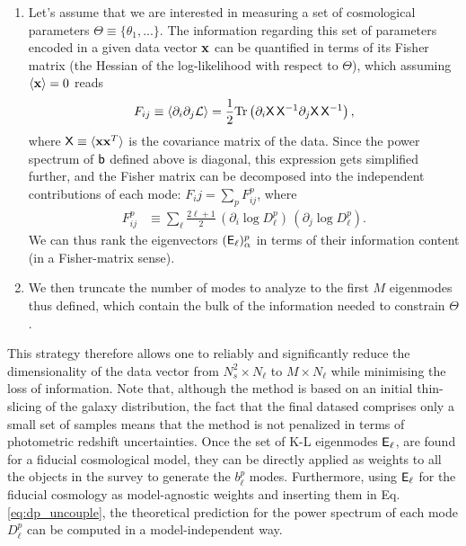\documentclass[twocolumn,amsfont,amssymb,amsmath, showpacs,balancelastpage, nofootinbib]{revtex4-1}
\begin{document}
\begin{enumerate}
      \item Let's assume that we are interested in measuring a set of cosmological parameters $\Theta\equiv\{\theta_1,...\}$. The information regarding this set of parameters encoded in a given data vector ${\bf x}$ can be quantified in terms of its Fisher matrix (the Hessian of the log-likelihood with respect to $\Theta$), which assuming $\langle{\bf x}\rangle=0$ reads
      \begin{equation}
        F_{ij}\equiv\left\langle\partial_i\partial_j{\cal L}\right\rangle=\frac{1}{2}{\rm Tr}\left(\partial_i{\sf X}\,{\sf X}^{-1}\partial_j{\sf X}\,{\sf X}^{-1}\right),
      \end{equation}
      where ${\sf X}\equiv\langle {\bf x}{\bf x}^T\rangle$ is the covariance matrix of the data. Since the power spectrum of ${\sf b}$ defined above is diagonal, this expression gets simplified further, and the Fisher matrix can be decomposed into the independent contributions of each mode: $F_ij=\sum_p F^p_{ij}$, where
      \begin{align}        
        F^p_{ij}&\equiv\sum_\ell\frac{2\ell+1}{2}\,(\partial_i\log D^p_\ell)\,(\partial_j\log D^p_\ell).
      \end{align}
      We can thus rank the eigenvectors $({\sf E}_\ell)^p_\alpha$ in terms of their information content (in a Fisher-matrix sense).
      \item We then truncate the number of modes to analyze to the first $M$ eigenmodes thus defined, which contain the bulk of the information needed to constrain $\Theta$.
    \end{enumerate}
    This strategy therefore allows one to reliably and significantly reduce the dimensionality of the data vector from $N_s^2\times N_\ell$ to $M\times N_\ell$ while minimising the loss of information. Note that, although the method is based on an initial thin-slicing of the galaxy distribution, the fact that the final datased comprises only a small set of samples means that the method is not penalized in terms of photometric redshift uncertainties. Once the set of K-L eigenmodes ${\sf E}_\ell$, are found for a fiducial cosmological model, they can be directly applied as weights to all the objects in the survey to generate the $b^p_\ell$ modes. Furthermore, using ${\sf E}_\ell$ for the fiducial cosmology as model-agnostic weights and inserting them in Eq. \ref{eq:dp_uncouple}, the theoretical prediction for the power spectrum of each mode $D^p_\ell$ can be computed in a model-independent way.
    
\end{document}
